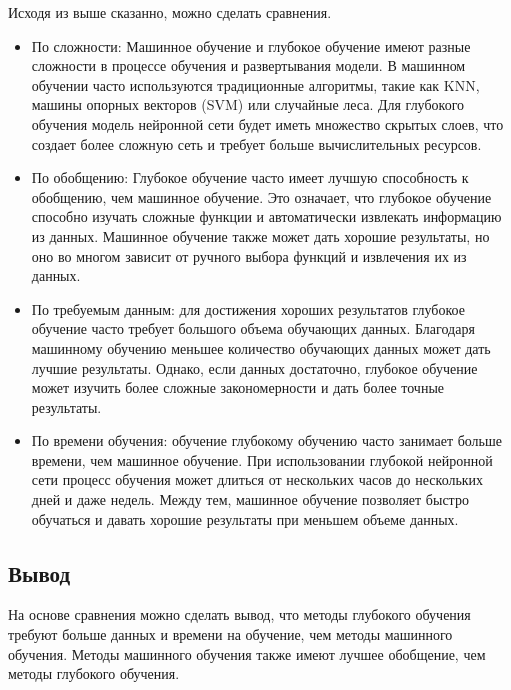 Исходя из выше сказанно, можно сделать сравнения.

\begin{itemize}[label = ---]
    \item По сложности: Машинное обучение и глубокое обучение имеют разные сложности в процессе обучения и развертывания модели. В машинном обучении часто используются традиционные алгоритмы, такие как KNN, машины опорных векторов (SVM) или случайные леса. Для глубокого обучения модель нейронной сети будет иметь множество скрытых слоев, что создает более сложную сеть и требует больше вычислительных ресурсов.
    \item По обобщению: Глубокое обучение часто имеет лучшую способность к обобщению, чем машинное обучение. Это означает, что глубокое обучение способно изучать сложные функции и автоматически извлекать информацию из данных. Машинное обучение также может дать хорошие результаты, но оно во многом зависит от ручного выбора функций и извлечения их из данных.
    \item По требуемым данным: для достижения хороших результатов глубокое обучение часто требует большого объема обучающих данных. Благодаря машинному обучению меньшее количество обучающих данных может дать лучшие результаты. Однако, если данных достаточно, глубокое обучение может изучить более сложные закономерности и дать более точные результаты.
    \item По времени обучения: обучение глубокому обучению часто занимает больше времени, чем машинное обучение. При использовании глубокой нейронной сети процесс обучения может длиться от нескольких часов до нескольких дней и даже недель. Между тем, машинное обучение позволяет быстро обучаться и давать хорошие результаты при меньшем объеме данных.
\end{itemize}

\subsection*{Вывод}
На основе сравнения можно сделать вывод, что методы глубокого обучения требуют больше данных и времени на обучение, чем методы машинного обучения. Методы машинного обучения также имеют лучшее обобщение, чем методы глубокого обучения.






